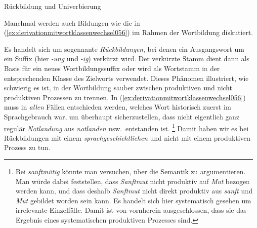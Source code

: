 
\begin{Vertiefung}{Rückbildung und Univerbierung}

\label{vert:rueckbildunguniverbierung}

\noindent Manchmal werden auch Bildungen wie die in (\ref{ex:derivationmitwortklassenwechsel056}) im Rahmen der Wortbildung diskutiert.

\begin{exe}
  \ex\label{ex:derivationmitwortklassenwechsel056}
  \begin{xlist}
  \end{xlist}
\end{exe}

Es handelt sich um sogennante \textit{Rückbildungen}, bei denen ein Ausgangswort um ein Suffix (hier \textit{-ung} und \textit{-ig}) verkürzt wird.
Der verkürzte Stamm dient dann als Basis für ein neues Wortbildungssuffix oder wird als Wortstamm in der entsprechenden Klasse des Zielworts verwendet.
Dieses Phänomen illustriert, wie schwierig es ist, in der Wortbildung sauber zwischen produktiven und nicht produktiven Prozessen zu trennen.
In (\ref{ex:derivationmitwortklassenwechsel056}) muss in \textit{allen} Fällen entschieden werden, welches Wort historisch zuerst im Sprachgebrauch war, um überhaupt sicherzustellen, dass nicht eigentlich ganz regulär \textit{Notlandung} aus \textit{notlanden} usw.\ entstanden ist.%
\footnote{Bei \textit{sanftmütig} könnte man versuchen, über die Semantik zu argumentieren.
Man würde dabei feststellen, dass \textit{Sanftmut} nicht produktiv auf \textit{Mut} bezogen werden kann, und dass deshalb \textit{Sanftmut} nicht direkt produktiv aus \textit{sanft} und \textit{Mut} gebildet worden sein kann.
Es handelt sich hier systematisch gesehen um irrelevante Einzelfälle.
Damit ist von vornherein ausgeschlossen, dass sie das Ergebnis eines systematischen produktiven Prozesses sind.}
Damit haben wir es bei Rückbildungen mit einem \textit{sprachgeschichtlichen} und nicht mit einem produktiven Prozess zu tun.


\end{Vertiefung}
